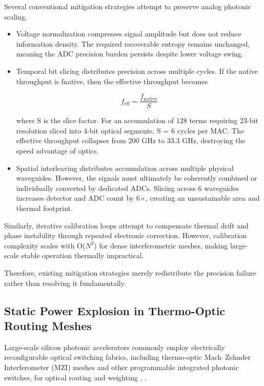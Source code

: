 \documentclass[journal]{IEEEtran}
\begin{document}
Several conventional mitigation strategies attempt to preserve analog photonic scaling.
\begin{itemize}
\item Voltage normalization compresses signal amplitude but does not reduce information density. The required recoverable entropy remains unchanged, meaning the ADC precision burden persists despite lower voltage swing.
\item Temporal bit slicing distributes precision across multiple cycles. If the native throughput is fnative, then the effective throughput becomes

\begin{equation}
f_{\text{eff}} = \frac{f_{\text{native}}}{S}
\end{equation}

where S is the slice factor. For an accumulation of 128 terms requiring 23-bit resolution sliced into 4-bit optical segments, S = 6 cycles per MAC. The effective throughput collapses from 200 GHz to 33.3 GHz, destroying the speed advantage of optics.
\item Spatial interleaving distributes accumulation across multiple physical waveguides. However, the signals must ultimately be coherently combined or individually converted by dedicated ADCs. Slicing across 6 waveguides increases detector and ADC count by 6$\times$, creating an unsustainable area and thermal footprint.
\end{itemize}

Similarly, iterative calibration loops attempt to compensate thermal drift and phase instability through repeated electronic correction.
However, calibration complexity scales with O($N^{2}$) for dense interferometric meshes, making large-scale stable operation thermally impractical. 

Therefore, existing mitigation strategies merely redistribute the precision failure rather than resolving it fundamentally.

\subsection{\textbf{Static Power Explosion in Thermo-Optic Routing Meshes}}
\label{sec:thermo_optic_scaling}

Large-scale silicon photonic accelerators commonly employ electrically reconfigurable optical switching fabrics, including thermo-optic Mach--Zehnder Interferometer (MZI) meshes and other programmable integrated photonic switches, for optical routing and weighting \cite{Miller2013}, \cite{Harris2018} \cite{Zhong2024}.
\end{document}
